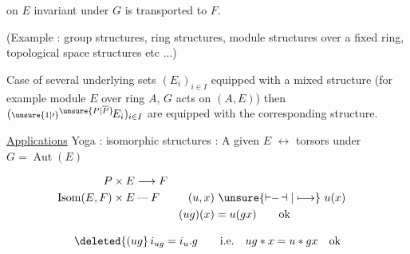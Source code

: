 on $E$ invariant under $G$ is transported to $F$.

(Example : group structures, ring structures, module structures over a fixed ring, topological space structures etc ...)

Case of several underlying sets $(E_i)_{i\in I}$  equipped with a mixed structure (for example module $E$ over ring $A$, $G$ acts on $(A,E)$) then $({\scriptstyle\unsure{1|\prime}}{}^{\unsure{P|\overline P}}\!E_i)_{i\in I}$ are equipped with the corresponding structure.


\uline{Applications}\quad {} Yoga : isomorphic structures : A given  $E$ $\longleftrightarrow$ torsors under $G=\operatorname{Aut}(E)$



\[
\begin{aligned}
P\times E&\longrightarrow F\\
\operatorname{Isom}(E,F)\times E&\mathbin{\text{---}} F
  & (u,x)&\ \unsure{\mathrel{\vdash\!\!-\!\dashv}|\longmapsto}\ u(x)\\
&& (ug)(x)&=u(gx)\qquad\text{ok}
\end{aligned}
\]


\[
\deleted{(ug}\,i_{ug}=i_u.g\qquad\text{i.e.}\quad ug*x=u*gx\quad\text{ok}
\]
